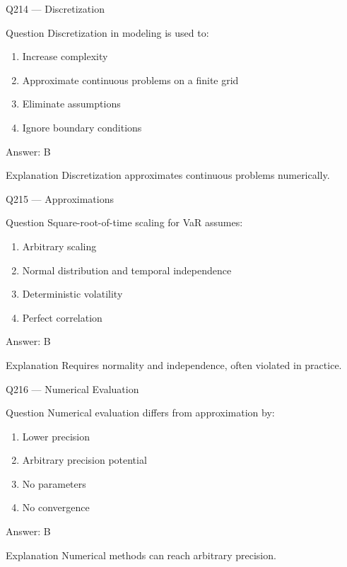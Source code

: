 \documentclass[aspectratio=169,8pt]{beamer}
\begin{document}
\begin{frame}{Q214 --- Discretization}
\begin{block}{Question}
Discretization in modeling is used to:
\begin{enumerate}
\item Increase complexity
\item Approximate continuous problems on a finite grid
\item Eliminate assumptions
\item Ignore boundary conditions
\end{enumerate}
\end{block}
\begin{exampleblock}{Answer: B}\end{exampleblock}
\begin{block}{Explanation}
Discretization approximates continuous problems numerically.
\end{block}
\end{frame}

\begin{frame}{Q215 --- Approximations}
\begin{block}{Question}
Square-root-of-time scaling for VaR assumes:
\begin{enumerate}
\item Arbitrary scaling
\item Normal distribution and temporal independence
\item Deterministic volatility
\item Perfect correlation
\end{enumerate}
\end{block}
\begin{exampleblock}{Answer: B}\end{exampleblock}
\begin{block}{Explanation}
Requires normality and independence, often violated in practice.
\end{block}
\end{frame}

\begin{frame}{Q216 --- Numerical Evaluation}
\begin{block}{Question}
Numerical evaluation differs from approximation by:
\begin{enumerate}
\item Lower precision
\item Arbitrary precision potential
\item No parameters
\item No convergence
\end{enumerate}
\end{block}
\begin{exampleblock}{Answer: B}\end{exampleblock}
\begin{block}{Explanation}
Numerical methods can reach arbitrary precision.
\end{block}
\end{frame}
\end{document}
